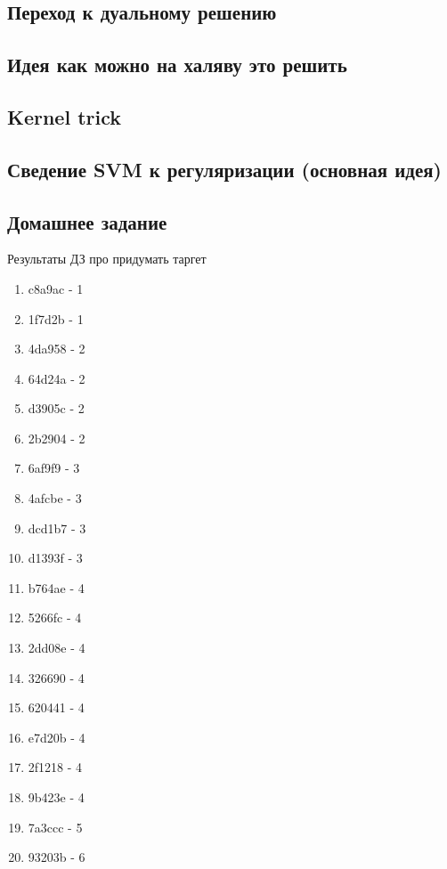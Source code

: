 \documentclass[14pt, fleqn, xcolor={dvipsnames, table}]{beamer}
\begin{document}
\subsection{Переход к дуальному решению}
\subsection{Идея как можно на халяву это решить}
\subsection{Kernel trick}
\subsection{Сведение SVM к регуляризации (основная идея)}
\subsection{Домашнее задание}



\begin{frame}{Результаты ДЗ про придумать таргет}
\tiny
\begin{center}
\begin{enumerate}
\item c8a9ac - 1
\item 1f7d2b - 1
\item 4da958 - 2
\item 64d24a - 2
\item d3905c - 2
\item 2b2904 - 2
\item 6af9f9 - 3
\item 4afcbe - 3
\item dcd1b7 - 3
\item d1393f - 3
\item b764ae - 4
\item 5266fc - 4
\item 2dd08e - 4
\item 326690 - 4
\item 620441 - 4
\item e7d20b - 4
\item 2f1218 - 4
\item 9b423e - 4
\item 7a3ccc - 5
\item 93203b - 6
\end{enumerate}
\end{center}
\end{frame}
\end{document}
